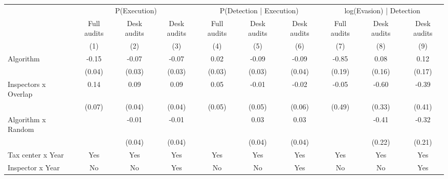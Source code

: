 \begin{tabular}{lccc|ccc|ccc} \toprule
\multicolumn{1}{l}{} & \multicolumn{3}{c}{P(Execution)} & \multicolumn{3}{c}{P(Detection | Execution)} & \multicolumn{3}{c}{log(Evasion) | Detection} \\\cmidrule(lr){2-4}\cmidrule(lr){5-7}\cmidrule(lr){8-10} \multicolumn{1}{l}{} & Full audits & Desk audits & Desk audits & Full audits & Desk audits & Desk audits & Full audits & Desk audits & Desk audits \\ \multicolumn{1}{l}{} & (1) & (2) & (3) & (4) & (5) & (6) & (7) & (8) & (9) \\ \midrule
Algorithm   &       -0.15\sym{***}&       -0.07\sym{**} &       -0.07\sym{**} &        0.02         &       -0.09\sym{**} &       -0.09\sym{**} &       -0.85\sym{***}&        0.08         &        0.12         \\
            &      (0.04)         &      (0.03)         &      (0.03)         &      (0.03)         &      (0.03)         &      (0.04)         &      (0.19)         &      (0.16)         &      (0.17)         \\
\addlinespace
Inspectors x Overlap&        0.14\sym{*}  &        0.09\sym{**} &        0.09\sym{**} &        0.05         &       -0.01         &       -0.02         &       -0.05         &       -0.60\sym{*}  &       -0.39         \\
            &      (0.07)         &      (0.04)         &      (0.04)         &      (0.05)         &      (0.05)         &      (0.06)         &      (0.49)         &      (0.33)         &      (0.41)         \\
\addlinespace
Algorithm x Random&                     &       -0.01         &       -0.01         &                     &        0.03         &        0.03         &                     &       -0.41\sym{*}  &       -0.32         \\
            &                     &      (0.04)         &      (0.04)         &                     &      (0.04)         &      (0.04)         &                     &      (0.22)         &      (0.21)         \\
\midrule
Tax center x Year&         Yes         &         Yes         &         Yes         &         Yes         &         Yes         &         Yes         &         Yes         &         Yes         &         Yes         \\
Inspector x Year&          No         &          No         &         Yes         &          No         &          No         &         Yes         &          No         &          No         &         Yes         \\

\end{tabular}
